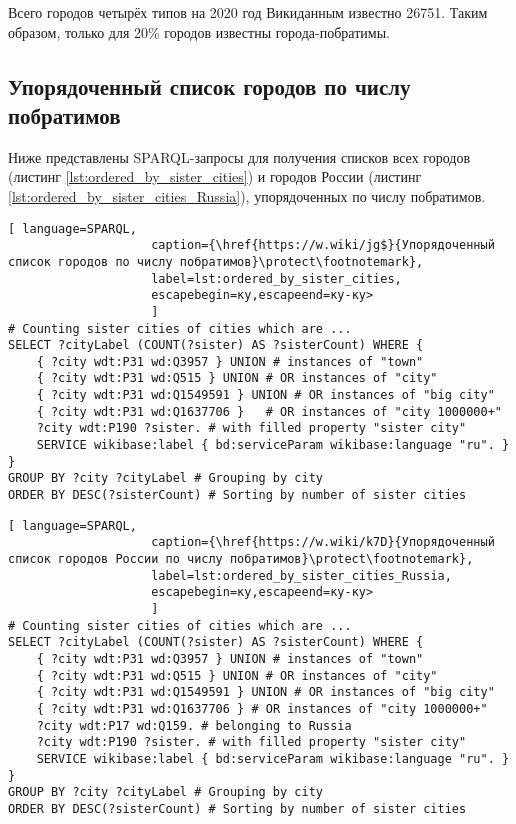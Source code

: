 Всего городов четырёх типов на 2020 год Викиданным известно \num{26751}. Таким образом, только для 20\% городов известны города-побратимы.

\subsection{Упорядоченный список городов по числу побратимов}

Ниже представлены SPARQL-запросы для получения списков всех городов (листинг \ref{lst:ordered_by_sister_cities}) и городов России (листинг \ref{lst:ordered_by_sister_cities_Russia}), упорядоченных по числу побратимов.

\begin{lstlisting}[ language=SPARQL, 
                    caption={\href{https://w.wiki/jg$}{Упорядоченный список городов по числу побратимов}\protect\footnotemark},
                    label=lst:ordered_by_sister_cities, 
                    escapebegin=ку,escapeend=ку-ку>
                    ]
# Counting sister cities of cities which are ...
SELECT ?cityLabel (COUNT(?sister) AS ?sisterCount) WHERE {           
	{ ?city wdt:P31 wd:Q3957 } UNION # instances of "town"
	{ ?city wdt:P31 wd:Q515 } UNION # OR instances of "city"
	{ ?city wdt:P31 wd:Q1549591 } UNION # OR instances of "big city"
	{ ?city wdt:P31 wd:Q1637706 }	# OR instances of "city 1000000+"
	?city wdt:P190 ?sister. # with filled property "sister city"
	SERVICE wikibase:label { bd:serviceParam wikibase:language "ru". }
}
GROUP BY ?city ?cityLabel # Grouping by city                                   
ORDER BY DESC(?sisterCount) # Sorting by number of sister cities
\end{lstlisting}

\begin{lstlisting}[ language=SPARQL, 
                    caption={\href{https://w.wiki/k7D}{Упорядоченный список городов России по числу побратимов}\protect\footnotemark},
                    label=lst:ordered_by_sister_cities_Russia, 
                    escapebegin=ку,escapeend=ку-ку>
                    ]
# Counting sister cities of cities which are ...
SELECT ?cityLabel (COUNT(?sister) AS ?sisterCount) WHERE {           
	{ ?city wdt:P31 wd:Q3957 } UNION # instances of "town"
	{ ?city wdt:P31 wd:Q515 } UNION # OR instances of "city"
	{ ?city wdt:P31 wd:Q1549591 } UNION # OR instances of "big city"
	{ ?city wdt:P31 wd:Q1637706 } # OR instances of "city 1000000+"      
	?city wdt:P17 wd:Q159. # belonging to Russia
	?city wdt:P190 ?sister. # with filled property "sister city"
	SERVICE wikibase:label { bd:serviceParam wikibase:language "ru". }
}
GROUP BY ?city ?cityLabel # Grouping by city
ORDER BY DESC(?sisterCount) # Sorting by number of sister cities
\end{lstlisting}

